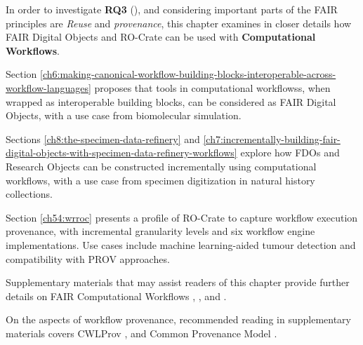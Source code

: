 In order to investigate \textbf{RQ3} (), and considering important parts of the FAIR principles are \emph{Reuse} and \emph{provenance}, this chapter examines in closer details how FAIR Digital Objects and RO-Crate can be used with \textbf{Computational Workflows}. 

Section \vref{ch6:making-canonical-workflow-building-blocks-interoperable-across-workflow-languages} proposes that tools in computational \glspl{workflows}, when wrapped as interoperable building blocks, can be considered as FAIR Digital Objects, with a use case from biomolecular simulation.

Sections \vref{ch8:the-specimen-data-refinery} and \vref{ch7:incrementally-building-fair-digital-objects-with-specimen-data-refinery-workflows} explore how FDOs and Research Objects can be constructed incrementally using computational workflows, with a use case from specimen digitization in natural history collections.

Section \vref{ch54:wrroc} presents a profile of RO-Crate to capture workflow execution provenance, with incremental granularity levels and six workflow engine implementations. Use cases include machine learning-aided tumour detection and compatibility with PROV approaches. 

Supplementary materials that may assist readers of this chapter provide further details on FAIR Computational Workflows \cite{Goble 2020},  \cite{Goble 2021},  \cite{Crusoe 2022} and  \cite{Brack 2022a}. 

On the aspects of workflow provenance, recommended reading in supplementary materials covers CWLProv \cite{Khan 2019},  \cite{De Geest 2022} and Common Provenance Model \cite{Wittner 2020,Wittner 2023a}.

